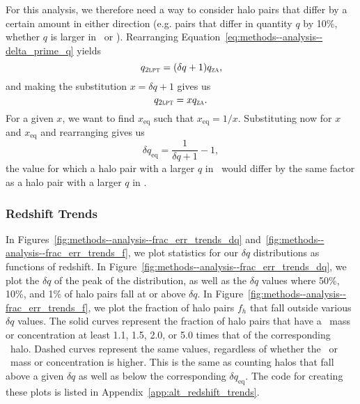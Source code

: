 For this analysis, we therefore need a way to consider halo pairs that differ by a certain amount in either direction (e.g. pairs that differ in quantity $q$ by 10\%, whether $q$ is larger in \lpt\ or \za).  Rearranging Equation~\ref{eq:methods--analysis--delta_prime_q} yields
\begin{equation}
	q_{\textsc{2lpt}} = (\delta q + 1) q_{\textsc{za}},
\end{equation}
and making the substitution $x = \delta q + 1$ gives us
\begin{equation}
	q_{\textsc{2lpt}} = x q_{\textsc{za}}.
\end{equation}
For a given $x$, we want to find $x_{\mathrm{eq}}$ such that $x_{\mathrm{eq}} = 1 / x$.  Substituting now for $x$ and $x_{\mathrm{eq}}$ and rearranging gives us
\begin{equation} \label{eq:methods--analysis--equivalent_q_prime}
	\delta q_{\mathrm{eq}} = \frac{1}{\delta q + 1} - 1,
\end{equation}
the value for which a halo pair with a larger $q$ in \za\ would differ by the same factor as a halo pair with a larger $q$ in \lpt.



\subsubsection{Redshift Trends}
\label{subsubsec:analysis--alt_diff_dist--trends}


In Figures~\ref{fig:methods--analysis--frac_err_trends_dq} and~\ref{fig:methods--analysis--frac_err_trends_f}, we plot statistics for our $\delta q$ distributions as functions of redshift.  In Figure~\ref{fig:methods--analysis--frac_err_trends_dq}, we plot the $\delta q$ of the peak of the distribution, as well as the $\delta q$ values where 50\%, 10\%, and 1\% of halo pairs fall at or above $\delta q$.  In Figure~\ref{fig:methods--analysis--frac_err_trends_f}, we plot the fraction of halo pairs $f_{h}$ that fall outside various $\delta q$ values.  The solid curves represent the fraction of halo pairs that have a \lpt\ mass or concentration at least 1.1, 1.5, 2.0, or 5.0 times that of the corresponding \za\ halo.  Dashed curves represent the same values, regardless of whether the \lpt\ or \za\ mass or concentration is higher.  This is the same as counting halos that fall above a given $\delta q$ as well as below the corresponding $\delta q_{\mathrm{eq}}$.  The code for creating these plots is listed in Appendix~\ref{app:alt_redshift_trends}.

